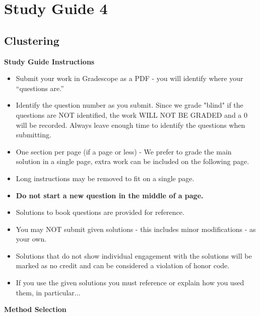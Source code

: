 \clearpage
\chapter{Study Guide 4}

\section{Clustering}

\begin{center}
    \large{\textbf{Study Guide Instructions}}
\end{center}


\begin{itemize}
    \item Submit your work in Gradescope as a PDF - you will identify where your “questions are.”
    \item Identify the question number as you submit.  Since we grade "blind" if the questions are NOT identified, the work WILL NOT BE GRADED and a 0 will be recorded. Always leave enough time to 
    identify the questions when submitting.
    \item One section per page (if a page or less) - We prefer to grade the main solution in a single page, extra work can be included on the following page.
    \item Long instructions may be removed to fit on a single page.
    \item \textbf{Do not start a new question in the middle of a page.}
    \item Solutions to book questions are provided for reference.
    \item You may NOT submit given solutions - this includes minor modifications - as your own.
    \item Solutions that do not show individual engagement with the solutions will be marked as no credit and can be considered a violation of honor code.
    \item If you use the given solutions you must reference or explain how you used them, in particular...
\end{itemize}


\begin{center}
    \large{\textbf{Method Selection}}
\end{center}


